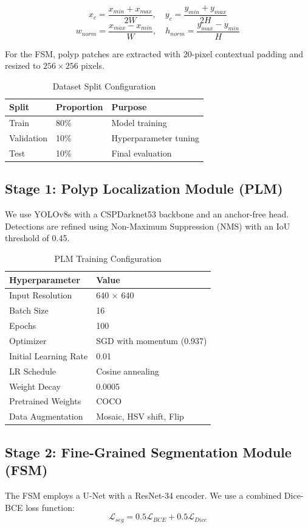\documentclass[11pt,a4paper]{article}
\begin{document}
$$x_c = \frac{x_{min} + x_{max}}{2W}, \quad y_c = \frac{y_{min} + y_{max}}{2H}$$
$$w_{norm} = \frac{x_{max} - x_{min}}{W}, \quad h_{norm} = \frac{y_{max} - y_{min}}{H}$$

For the FSM, polyp patches are extracted with 20-pixel contextual padding and resized to $256 \times 256$ pixels.

\begin{table}[h]
\centering
\caption{Dataset Split Configuration}
\begin{tabular}{lll}
\toprule
Split & Proportion & Purpose \\
\midrule
Train & 80\% & Model training \\
Validation & 10\% & Hyperparameter tuning \\
Test & 10\% & Final evaluation \\
\bottomrule
\end{tabular}
\end{table}

\subsection{Stage 1: Polyp Localization Module (PLM)}
We use YOLOv8s with a CSPDarknet53 backbone and an anchor-free head. Detections are refined using Non-Maximum Suppression (NMS) with an IoU threshold of 0.45.

\begin{table}[h]
\centering
\caption{PLM Training Configuration}
\begin{tabular}{ll}
\toprule
Hyperparameter & Value \\
\midrule
Input Resolution & 640 $\times$ 640 \\
Batch Size & 16 \\
Epochs & 100 \\
Optimizer & SGD with momentum (0.937) \\
Initial Learning Rate & 0.01 \\
LR Schedule & Cosine annealing \\
Weight Decay & 0.0005 \\
Pretrained Weights & COCO \\
Data Augmentation & Mosaic, HSV shift, Flip \\
\bottomrule
\end{tabular}
\end{table}

\subsection{Stage 2: Fine-Grained Segmentation Module (FSM)}
The FSM employs a U-Net with a ResNet-34 encoder. We use a combined Dice-BCE loss function:
$$\mathcal{L}_{seg} = 0.5 \mathcal{L}_{BCE} + 0.5 \mathcal{L}_{Dice}$$
\end{document}
